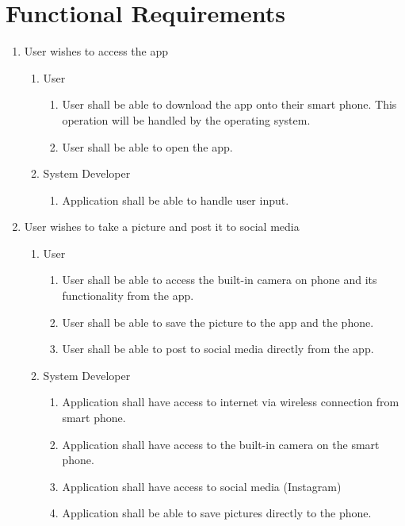 \documentclass[]{article}
\begin{document}
\section{Functional Requirements}
\label{sec:functional_requirements}


\begin{enumerate}[{BE}1.]
	\item User wishes to access the app
	\begin{enumerate}[{VP1}.1]
		\item User
			\begin{enumerate}
				\item User shall be able to download the app onto their smart phone.  This operation will be handled by the operating system.
				\item User shall be able to open the app.
			\end{enumerate}
		\item System Developer
			\begin{enumerate}
				\item Application shall be able to handle user input.
			\end{enumerate}
	\end{enumerate}
	\item User wishes to take a picture and post it to social media
	\begin{enumerate}[{VP2}.1]
		\item User
			\begin{enumerate}
				\item User shall be able to access the built-in camera on phone and its functionality from the app.
				\item User shall be able to save the picture to the app and the phone.
				\item User shall be able to post to social media directly from the app.
			\end{enumerate}
		\item System Developer
			\begin{enumerate}
				\item Application shall have access to internet via wireless connection from smart phone.
				\item Application shall have access to the built-in camera on the smart phone.
				\item Application shall have access to social media (Instagram)
				\item Application shall be able to save pictures directly to the phone.
			\end{enumerate}

\end{enumerate}
\end{enumerate}
\end{document}
